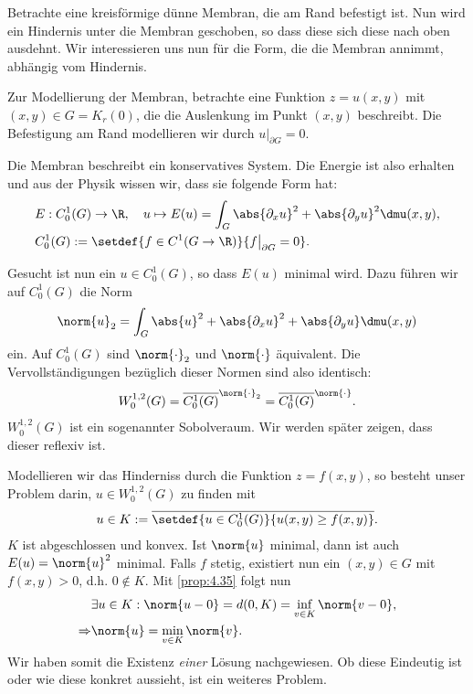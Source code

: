 \begin{bsp}[Anwendung]
\label{bsp:4.36}
Betrachte eine kreisförmige dünne Membran, die am Rand befestigt ist. Nun wird
ein Hindernis unter die Membran geschoben, so dass diese sich diese nach oben
ausdehnt. Wir interessieren uns nun für die Form, die die Membran annimmt,
abhängig vom Hindernis.

Zur Modellierung der Membran, betrachte eine Funktion $z=u(x,y)$ mit $(x,y)\in
G=K_r(0)$, die die Auslenkung im Punkt $(x,y)$ beschreibt. Die Befestigung am
Rand modellieren wir durch $u\big|_{\partial G} = 0$.

Die Membran beschreibt ein konservatives System. Die Energie ist also erhalten
und aus der Physik wissen wir, dass sie folgende Form hat:
\begin{align*}
&E: C_0^1(G)\to \R,\quad u\mapsto E(u) = \int_G \abs{\partial_x u}^2 +
\abs{\partial_y u}^2\dmu(x,y),\\
&C_0^1(G) := \setdef{f\in C^1(G\to\R)}{f\big|_{\partial G}=0}.
\end{align*}

Gesucht ist nun ein $u\in C_0^1(G)$, so dass $E(u)$ minimal wird. Dazu führen
wir auf $C_0^1(G)$ die Norm
\begin{align*}
\norm{u}_2 = \int_G \abs{u}^2 + \abs{\partial_x u}^2+ \abs{\partial_y
u}\dmu(x,y)
\end{align*}
ein. Auf $C_0^1(G)$ sind $\norm{\cdot}_2$ und $\norm{\cdot}$ äquivalent. Die
Vervollständigungen bezüglich dieser Normen sind also identisch: 
\begin{align*}
W_0^{1,2}(G) = \overline{C_0^1(G)}^{\norm{\cdot}_2} =
\overline{C_0^1(G)}^{\norm{\cdot}}.
\end{align*}
$W_0^{1,2}(G)$ ist ein sogenannter Sobolveraum. Wir werden später zeigen, dass
dieser reflexiv ist.

Modellieren wir das Hinderniss durch die Funktion $z=f(x,y)$, so 
besteht unser Problem darin, $u\in W_0^{1,2}(G)$ zu finden mit
\begin{align*}
u\in K := \overline{\setdef{u\in C_0^1(G)}{u(x,y)\ge f(x,y)}}.
\end{align*}
$K$ ist abgeschlossen und konvex. Ist $\norm{u}$ minimal, dann ist auch
$E(u)=\norm{u}^2$ minimal. Falls $f$ stetig, existiert nun ein $(x,y)\in G$ mit
$f(x,y)> 0$, d.h. $0\notin K$. Mit \ref{prop:4.35} folgt nun
\begin{align*}
&\exists u\in K : \norm{u-0} = d(0,K) = \inf\limits_{v\in K}\norm{v-0},\\
\Rightarrow & \norm{u} = \min\limits_{v\in K}\norm{v}.
\end{align*}
Wir haben somit die Existenz \textit{einer} Lösung nachgewiesen. Ob diese
Eindeutig ist oder wie diese konkret aussieht, ist ein weiteres Problem.\bsphere 
\end{bsp}